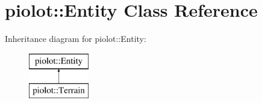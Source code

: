 \hypertarget{classpiolot_1_1_entity}{}\section{piolot\+:\+:Entity Class Reference}
\label{classpiolot_1_1_entity}
Inheritance diagram for piolot\+:\+:Entity\+:\begin{figure}[H]
\begin{center}
\leavevmode
\includegraphics[height=2.000000cm]{classpiolot_1_1_entity}
\end{center}
\end{figure}
